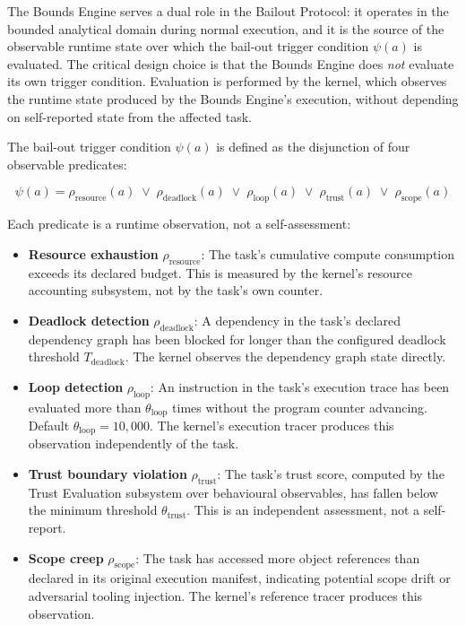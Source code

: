 The Bounds Engine serves a dual role in the Bailout Protocol: it operates in the bounded analytical domain during normal execution, and it is the source of the observable runtime state over which the bail-out trigger condition $\psi(a)$ is evaluated. The critical design choice is that the Bounds Engine does \textit{not} evaluate its own trigger condition. Evaluation is performed by the kernel, which observes the runtime state produced by the Bounds Engine's execution, without depending on self-reported state from the affected task.

The bail-out trigger condition $\psi(a)$ is defined as the disjunction of four observable predicates:

\begin{equation}
\psi(a) = \rho_{\text{resource}}(a) \;\lor\; \rho_{\text{deadlock}}(a) \;\lor\; \rho_{\text{loop}}(a) \;\lor\; \rho_{\text{trust}}(a) \;\lor\; \rho_{\text{scope}}(a)
\tag{BP-psi}
\end{equation}

Each predicate is a runtime observation, not a self-assessment:

\begin{itemize}
\item \textbf{Resource exhaustion} $\rho_{\text{resource}}$: The task's cumulative compute consumption exceeds its declared budget. This is measured by the kernel's resource accounting subsystem, not by the task's own counter.

\item \textbf{Deadlock detection} $\rho_{\text{deadlock}}$: A dependency in the task's declared dependency graph has been blocked for longer than the configured deadlock threshold $T_{\text{deadlock}}$. The kernel observes the dependency graph state directly.

\item \textbf{Loop detection} $\rho_{\text{loop}}$: An instruction in the task's execution trace has been evaluated more than $\theta_{\text{loop}}$ times without the program counter advancing. Default $\theta_{\text{loop}} = 10{,}000$. The kernel's execution tracer produces this observation independently of the task.

\item \textbf{Trust boundary violation} $\rho_{\text{trust}}$: The task's trust score, computed by the Trust Evaluation subsystem over behavioural observables, has fallen below the minimum threshold $\theta_{\text{trust}}$. This is an independent assessment, not a self-report.

\item \textbf{Scope creep} $\rho_{\text{scope}}$: The task has accessed more object references than declared in its original execution manifest, indicating potential scope drift or adversarial tooling injection. The kernel's reference tracer produces this observation.
\end{itemize}

